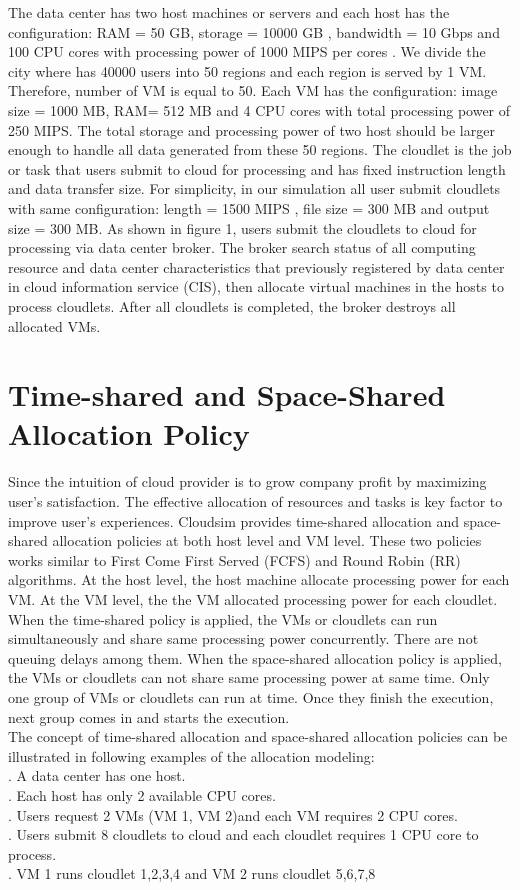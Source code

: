 \documentclass[12pt]{article}
\begin{document}
\indent The data center has two host machines or servers and each host has the configuration: RAM = 50 GB,  storage  = 10000 GB , bandwidth = 10 Gbps and  100 CPU cores with processing power of 1000 MIPS per cores .  We divide the city where has 40000 users into 50 regions and each region is served by 1 VM.  Therefore, number of VM is equal to 50.  Each VM has the configuration: image size = 1000 MB, RAM= 512 MB and 4 CPU cores with total processing power of 250 MIPS. The total storage and processing power of two host should be larger enough to handle all data  generated from these 50 regions.  The cloudlet is the  job or task that users submit to cloud for processing and has fixed instruction length and data transfer size. For simplicity, in our simulation all user submit cloudlets with same configuration: length = 1500 MIPS , file size = 300 MB and output size = 300 MB.
\indent As shown in figure 1, users submit the cloudlets to cloud for processing via data center broker.  The broker search status of all computing resource and data center characteristics that previously registered by data center in cloud information service (CIS), then allocate virtual machines in the hosts to process cloudlets. After all cloudlets is completed, the broker destroys all allocated VMs.

\section{Time-shared and Space-Shared Allocation Policy}
Since the intuition of cloud provider is to grow company profit by maximizing user's satisfaction. The effective allocation of resources and tasks is key factor to improve user's experiences. Cloudsim provides time-shared allocation and space-shared allocation policies at both host level and VM level.  These two policies works similar to First Come
First Served (FCFS) and Round Robin (RR) algorithms\cite{ok3}. At the host level, the host machine allocate processing power for each VM.  At the VM level, the the VM allocated processing power for each cloudlet.  When the time-shared policy is applied, the VMs or cloudlets can run simultaneously and share same processing power concurrently. There are not queuing delays among them.  When the space-shared allocation policy is applied, the VMs or cloudlets can not share same processing power at same time. Only one group of VMs or cloudlets can run at time. Once they finish the execution, next group comes in and starts the execution.\\
\indent The concept of time-shared allocation and space-shared allocation policies can be illustrated in following examples of the allocation modeling:\\
. A data center has one host. \\
. Each host has only 2 available CPU cores.\\
. Users request 2 VMs (VM 1, VM 2)and each VM requires 2 CPU cores.\\
. Users submit 8 cloudlets to cloud and each cloudlet requires 1 CPU core to process. \\
. VM 1 runs cloudlet 1,2,3,4 and VM 2 runs cloudlet 5,6,7,8
\end{document}
